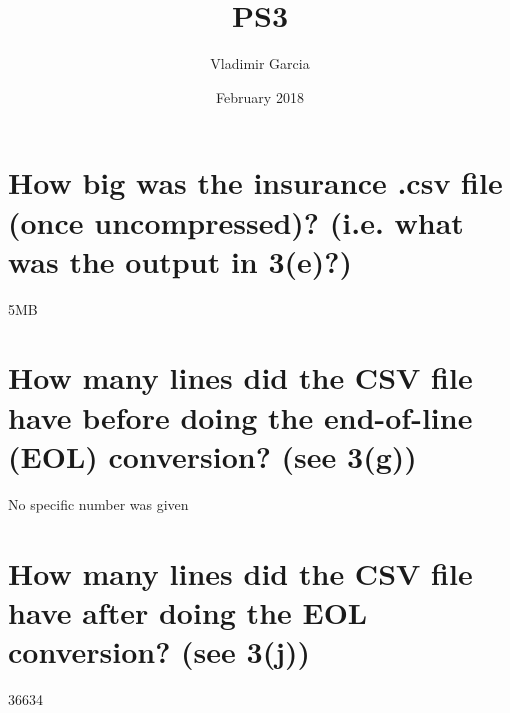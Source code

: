 \documentclass{article}
\title{PS3}
\author{Vladimir Garcia}
\date{February 2018}
\begin{document}
\maketitle

\section{How big was the insurance .csv file (once uncompressed)? (i.e. what was the
output in 3(e)?)}
5MB

\section{How many lines did the CSV file have before doing the end-of-line (EOL) conversion? (see 3(g))}
No specific number was given

\section{How many lines did the CSV file have after doing the EOL conversion? (see 3(j))}
36634
\end{document}
